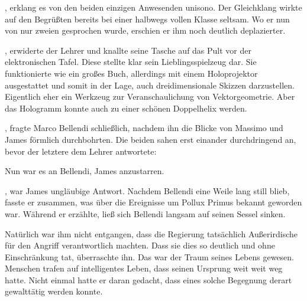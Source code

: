 \par

, erklang es von den beiden einzigen Anwesenden unisono. Der Gleichklang wirkte auf den Begrüßten bereits bei einer halbwegs vollen Klasse seltsam. Wo er nun von nur zweien gesprochen wurde, erschien er ihm noch deutlich deplazierter.

\par

, erwiderte der Lehrer und knallte seine Tasche auf das Pult vor der elektronischen Tafel. Diese stellte klar sein Lieblingsspielzeug dar. Sie funktionierte wie ein großes Buch, allerdings mit einem Holoprojektor ausgestattet und somit in der Lage, auch dreidimensionale Skizzen darzustellen. Eigentlich eher ein Werkzeug zur Veranschaulichung von Vektorgeometrie. Aber das Hologramm konnte auch zu einer schönen Doppelhelix werden.

\par

, fragte Marco Bellendi schließlich, nachdem ihn die Blicke von Massimo und James förmlich durchbohrten. Die beiden sahen erst einander durchdringend an, bevor der letztere dem Lehrer antwortete: 

\par

Nun war es an Bellendi, James anzustarren. 

\par

, war James ungläubige Antwort. Nachdem Bellendi eine Weile lang still blieb, fasste er zusammen, was über die Ereignisse um Pollux Primus bekannt geworden war. Während er erzählte, ließ sich Bellendi langsam auf seinen Sessel sinken.

\par

Natürlich war ihm nicht entgangen, dass die Regierung tatsächlich Außerirdische für den Angriff verantwortlich machten. Dass sie dies so deutlich und ohne Einschränkung tat, überraschte ihn. Das war der Traum seines Lebens gewesen. Menschen trafen auf intelligentes Leben, dass seinen Ursprung weit weit weg hatte. Nicht einmal hatte er daran gedacht, dass eines solche Begegnung derart gewalttätig werden konnte.

\par

